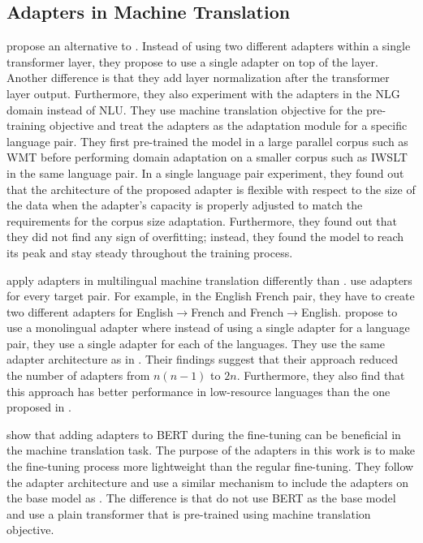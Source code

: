 \subsection{Adapters in Machine Translation}
\label{sec:app_mt}
 propose an alternative to . Instead of using two different adapters within a single transformer layer, they propose to use a single adapter on top of the layer. Another difference is that they add layer normalization after the transformer layer output. Furthermore, they also experiment with the adapters in the NLG domain instead of NLU. They use machine translation objective for the pre-training objective and treat the adapters as the adaptation module for a specific language pair. They first pre-trained the model in a large parallel corpus such as WMT before performing domain adaptation on a smaller corpus such as IWSLT in the same language pair. In a single language pair experiment, they found out that the architecture of the proposed adapter is flexible with respect to the size of the data when the adapter's capacity is properly adjusted to match the requirements for the corpus size adaptation. Furthermore, they found out that they did not find any sign of overfitting; instead, they found the model to reach its peak and stay steady throughout the training process.

 apply adapters in multilingual machine translation differently than .  use adapters for every target pair. For example, in the English French pair, they have to create two different adapters for English$\rightarrow$French and French$\rightarrow$English.  propose to use a monolingual adapter where instead of using a single adapter for a language pair, they use a single adapter for each of the languages. They use the same adapter architecture as in . Their findings suggest that their approach reduced the number of adapters from $n(n-1)$ to $2n$. Furthermore, they also find that this approach has better performance in low-resource languages than the one proposed in .

 show that adding adapters to BERT during the fine-tuning can be beneficial in the machine translation task. The purpose of the adapters in this work is to make the fine-tuning process more lightweight than the regular fine-tuning. They follow the adapter architecture and use a similar mechanism to include the adapters on the base model as . The difference is that  do not use BERT as the base model and use a plain transformer that is pre-trained using machine translation objective.



